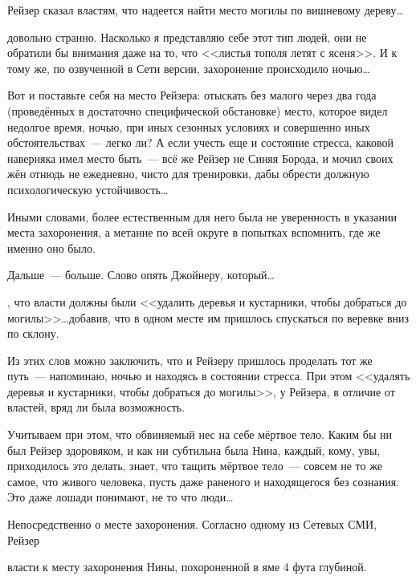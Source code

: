 \begin{shadequote}{}
Рейзер сказал властям, что надеется найти место могилы по вишневому дереву\dots 
\end{shadequote}

 довольно странно. Насколько я представляю себе этот тип людей, они не обратили бы внимания даже на то, что <<листья тополя летят с ясеня>>. И к тому же, по озвученной в Сети версии, захоронение происходило ночью\dots 

Вот и поставьте себя на место Рейзера: отыскать без малого через два года (проведённых в достаточно специфической обстановке) место, которое видел недолгое время, ночью, при иных сезонных условиях и совершенно иных обстоятельствах~--- легко ли? А если учесть еще и состояние стресса, каковой наверняка имел место быть~--- всё же Рейзер не Синяя Борода, и мочил своих жён отнюдь не ежедневно, чисто для тренировки, дабы обрести должную психологическую устойчивость\dots 

Иными словами, более естественным для него была не уверенность в указании места захоронения, а метание по всей округе в попытках вспомнить, где же именно оно было. 

Дальше~--- больше. Слово опять Джойнеру, который\dots 


\begin{shadequote}{}
, что власти должны были <<удалить деревья и кустарники, чтобы добраться до могилы>>\dots добавив, что в одном месте им пришлось спускаться по веревке вниз по склону. 
\end{shadequote}

Из этих слов можно заключить, что и Рейзеру пришлось проделать тот же путь~--- напоминаю, ночью и находясь в состоянии стресса. При этом <<удалять деревья и кустарники, чтобы добраться до могилы>>, у Рейзера, в отличие от властей, вряд ли была возможность. 

Учитываем при этом, что обвиняемый нес на себе мёртвое тело. Каким бы ни был Рейзер здоровяком, и как ни субтильна была Нина, каждый, кому, увы, приходилось это делать, знает, что тащить мёртвое тело~--- совсем не то же самое, что живого человека, пусть даже раненого и находящегося без сознания. Это даже лошади понимают, не то что люди\dots 

Непосредственно о месте захоронения. Согласно одному из Сетевых СМИ, Рейзер 


\begin{shadequote}{}
 власти к месту захоронения Нины, похороненной в яме 4 фута глубиной. 
\end{shadequote}


